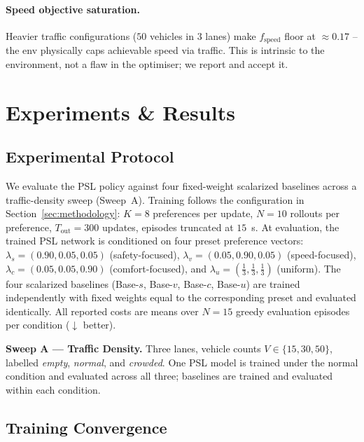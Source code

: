 \documentclass[12pt, letterpaper]{article}
\begin{document}
\paragraph{Speed objective saturation.}
Heavier traffic configurations ($50$ vehicles in $3$ lanes) make $f_{\text{speed}}$ floor at $\approx 0.17$ -- the env physically caps achievable speed via traffic. This is intrinsic to the environment, not a flaw in the optimiser; we report and accept it.

\section{Experiments \& Results}
\label{sec:experiments}

\subsection{Experimental Protocol}

We evaluate the PSL policy against four fixed-weight scalarized baselines across a traffic-density sweep (Sweep~A).
Training follows the configuration in Section~\ref{sec:methodology}: $K=8$ preferences per update, $N=10$ rollouts per preference, $T_{\text{out}}=300$ updates, episodes truncated at $15$~s.
At evaluation, the trained PSL network is conditioned on four preset preference vectors:
$\lambda_s = (0.90, 0.05, 0.05)$ (safety-focused),
$\lambda_v = (0.05, 0.90, 0.05)$ (speed-focused),
$\lambda_c = (0.05, 0.05, 0.90)$ (comfort-focused), and
$\lambda_u = (\tfrac{1}{3}, \tfrac{1}{3}, \tfrac{1}{3})$ (uniform).
The four scalarized baselines (Base-$s$, Base-$v$, Base-$c$, Base-$u$) are trained independently with fixed weights equal to the corresponding preset and evaluated identically.
All reported costs are means over $N=15$ greedy evaluation episodes per condition ($\downarrow$ better).

\textbf{Sweep A --- Traffic Density.}
Three lanes, vehicle counts $V \in \{15, 30, 50\}$, labelled \emph{empty}, \emph{normal}, and \emph{crowded}.
One PSL model is trained under the normal condition and evaluated across all three; baselines are trained and evaluated within each condition.

\subsection{Training Convergence}
\end{document}
